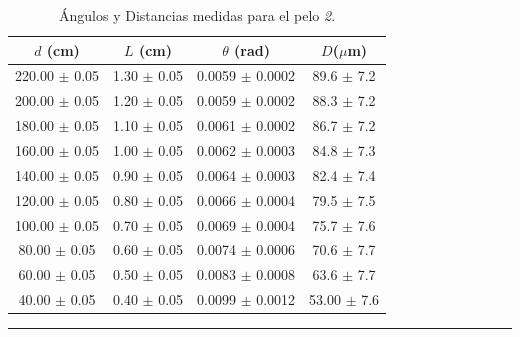\documentclass[10pt,a4paper]{article}
\begin{document}
	\begin{table}[H]
		\centering
		\begin{tabular}{|c|c|c|c|}
			\hline
			$d$ (cm) & $L$ (cm) & $\theta$ (rad) &  $D$($\mu$m) \\ \hline
			220.00 $\pm$ 0.05  & 1.30 $\pm$ 0.05 &  0.0059 $\pm$ 0.0002  & 89.6 $\pm$ 7.2\\
			200.00 $\pm$ 0.05  & 1.20 $\pm$ 0.05 &  0.0059 $\pm$ 0.0002  & 88.3 $\pm$ 7.2 \\
			180.00 $\pm$ 0.05  & 1.10 $\pm$ 0.05 &  0.0061 $\pm$ 0.0002 & 86.7 $\pm$ 7.2\\
			160.00 $\pm$ 0.05  & 1.00 $\pm$ 0.05 &  0.0062 $\pm$ 0.0003 & 84.8 $\pm$ 7.3 \\ 
			140.00 $\pm$ 0.05 & 0.90 $\pm$ 0.05 & 0.0064 $\pm$ 0.0003 & 82.4 $\pm$ 7.4\\ 
			120.00 $\pm$ 0.05 & 0.80 $\pm$ 0.05 & 0.0066 $\pm$ 0.0004 &  79.5 $\pm$ 7.5\\ 
			100.00 $\pm$ 0.05 & 0.70 $\pm$ 0.05 & 0.0069 $\pm$ 0.0004 & 75.7 $\pm$ 7.6\\
			80.00 $\pm$ 0.05  & 0.60 $\pm$ 0.05 &  0.0074 $\pm$ 0.0006 & 70.6 $\pm$ 7.7 \\ 
			60.00 $\pm$ 0.05 & 0.50 $\pm$ 0.05 &  0.0083 $\pm$ 0.0008 & 63.6 $\pm$ 7.7 \\
			40.00 $\pm$ 0.05 & 0.40 $\pm$ 0.05 &  0.0099 $\pm$ 0.0012 & 53.00 $\pm$ 7.6  \\ \hline
			
		\end{tabular}
		\caption{Ángulos y Distancias medidas para el pelo \textit{2}.}
		\label{tab:angulos_distancias 2.}
		\rule{100mm}{0.1mm}
	\end{table}
	
\end{document}
